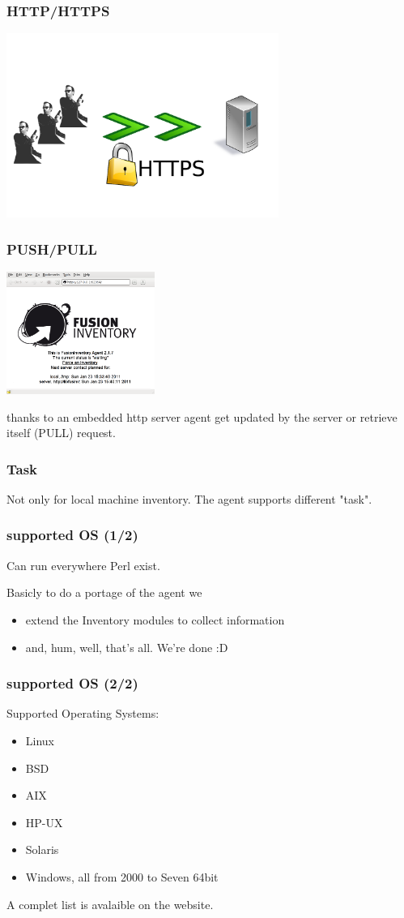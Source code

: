 \begin{frame}
\frametitle{HTTP/HTTPS}
%
\includegraphics[height=6.0cm]{pics/https.pdf}
%
\end{frame}
\begin{frame}
\frametitle{PUSH/PULL}
\includegraphics[height=4.0cm]{pics/http-server.png}

thanks to an embedded http server agent get updated by the server or retrieve itself (PULL) request.
%
\end{frame}



\begin{frame}
\frametitle{Task}
%
Not only for local machine inventory. The agent supports different "task".
\end{frame}



\begin{frame}
\frametitle{supported OS (1/2)}
Can run everywhere Perl exist.

\pause
Basicly to do a portage of the agent we
\begin{itemize}
%
\item extend the Inventory modules to collect information
\item and, hum, well, that's all. We're done :D
%
\end{itemize}

\end{frame}
\begin{frame}
\frametitle{supported OS (2/2)}
Supported Operating Systems:
\begin{itemize}
%
\item Linux
\pause
\item BSD
\pause
\item AIX
\pause
\item HP-UX
\pause
\item Solaris
\pause
\item Windows, all from 2000 to Seven 64bit
%
\end{itemize}
A complet list is avalaible on the website.
\end{frame}
 
